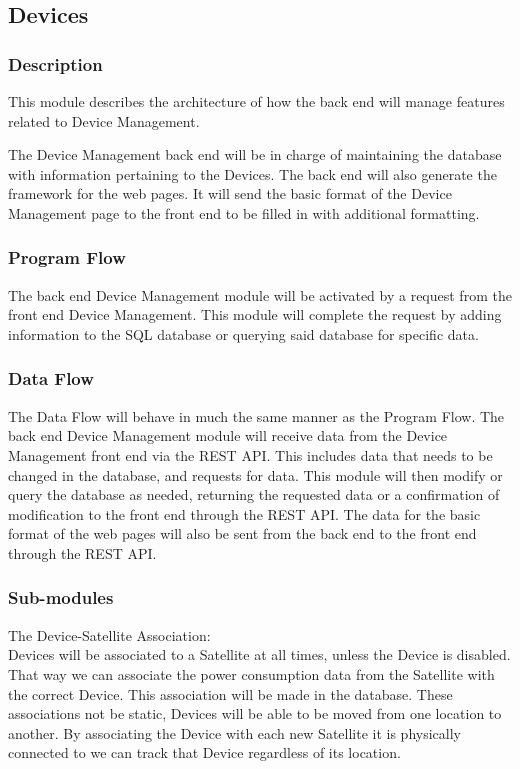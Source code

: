 
\subsection{Devices}

\subsubsection{Description}

This module describes the architecture of how the back end will manage features related to Device Management. 

The Device Management back end will be in charge of maintaining the database with information pertaining to the Devices. 
The back end will also generate the framework for the web pages. 
It will send the basic format of the Device Management page to the front end to be filled in with additional formatting. 
 

\subsubsection{Program Flow}

The back end Device Management module will be activated by a request from the front end Device Management. 
This module will complete the request by adding information to the \ac{SQL} database or querying said database for specific data. 

\subsubsection{Data Flow}

The Data Flow will behave in much the same manner as the Program Flow. 
The back end Device Management module will receive data from the Device Management front end via the \ac{REST} \ac{API}. 
This includes data that needs to be changed in the database, and requests for data. 
This module will then modify or query the database as needed, 
returning the requested data or a confirmation of modification to the front end through the \ac{REST} \ac{API}. 
The data for the basic format of the web pages will also be sent from the back end to the front end through the \ac{REST} \ac{API}. 

\subsubsection{Sub-modules}
The Device-Satellite Association: \\
Devices will be associated to a Satellite at all times, unless the Device is disabled. 
That way we can associate the power consumption data from the Satellite with the correct Device. 
This association will be made in the database. 
These associations not be static, Devices will be able to be moved from one location to another. 
By associating the Device with each new Satellite it is physically connected to we can track that Device regardless of its location. 

